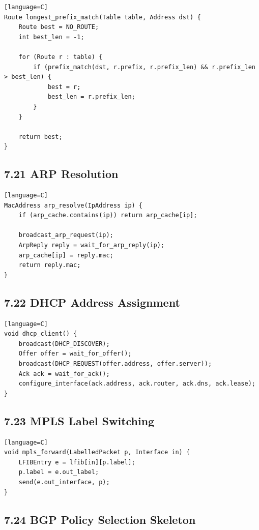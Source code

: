 \documentclass[11pt]{article}
\begin{document}
\begin{verbatim}[language=C]
Route longest_prefix_match(Table table, Address dst) {
    Route best = NO_ROUTE;
    int best_len = -1;

    for (Route r : table) {
        if (prefix_match(dst, r.prefix, r.prefix_len) && r.prefix_len > best_len) {
            best = r;
            best_len = r.prefix_len;
        }
    }

    return best;
}
\end{verbatim}

\subsection{7.21 ARP Resolution}\label{arp-resolution}

\begin{verbatim}[language=C]
MacAddress arp_resolve(IpAddress ip) {
    if (arp_cache.contains(ip)) return arp_cache[ip];

    broadcast_arp_request(ip);
    ArpReply reply = wait_for_arp_reply(ip);
    arp_cache[ip] = reply.mac;
    return reply.mac;
}
\end{verbatim}

\subsection{7.22 DHCP Address Assignment}\label{dhcp-address-assignment}

\begin{verbatim}[language=C]
void dhcp_client() {
    broadcast(DHCP_DISCOVER);
    Offer offer = wait_for_offer();
    broadcast(DHCP_REQUEST(offer.address, offer.server));
    Ack ack = wait_for_ack();
    configure_interface(ack.address, ack.router, ack.dns, ack.lease);
}
\end{verbatim}

\subsection{7.23 MPLS Label Switching}\label{mpls-label-switching}

\begin{verbatim}[language=C]
void mpls_forward(LabelledPacket p, Interface in) {
    LFIBEntry e = lfib[in][p.label];
    p.label = e.out_label;
    send(e.out_interface, p);
}
\end{verbatim}

\subsection{7.24 BGP Policy Selection
Skeleton}\label{bgp-policy-selection-skeleton}
\end{document}
